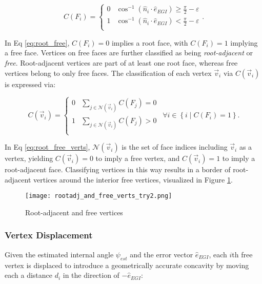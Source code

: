 \begin{equation} \label{eq:root_free}
  C(F_i) = \begin{cases} 
    0 & \cos^{-1}\left( \hat{n}_i \cdot \hat{e}_{EGI} \right) \geq \frac{\pi}{2} - \varepsilon \\
    1 & \cos^{-1}\left( \hat{n}_i \cdot \hat{e}_{EGI} \right) < \frac{\pi}{2} - \varepsilon \\
  \end{cases}.
\end{equation}

In Eq \ref{eq:root_free}, $C(F_i) = 0$ implies a root face, with $C(F_i) = 1$ implying a free face. Vertices on free faces are further classified as being \textit{root-adjacent} or \textit{free}. Root-adjacent vertices are part of at least one root face, whereas free vertices belong to only free faces. The classification of each vertex $\vec{v}_i$ via $C(\vec{v}_i)$ is expressed via:

\begin{equation} \label{eq:root_free_verts}
  C(\vec{v}_i) = \begin{cases}
    0 & \sum_{j \in \mathcal{N}(\vec{v}_i)}{C(F_j)} = 0 \\
    1 & \sum_{j \in \mathcal{N}(\vec{v}_i)}{C(F_j)} > 0 \\    
  \end{cases} \: \: \forall i \in \left\{ i \mid C(F_i) = 1 \right\}.
\end{equation}

In Eq \ref{eq:root_free_verts}, $\mathcal{N}(\vec{v}_i)$ is the set of face indices including $\vec{v}_i$ as a vertex, yielding $C(\vec{v}_i) = 0$ to imply a free vertex, and $C(\vec{v}_i) = 1$ to imply a root-adjacent face. Classifying vertices in this way results in a border of root-adjacent vertices around the interior free vertices, visualized in Figure \ref{fig:root_and_free}.

\begin{figure}[!htb]
  \centering
  \texttt{[image: rootadj\_and\_free\_verts\_try2.png]}
  \caption{Root-adjacent and free vertices}
  \label{fig:root_and_free}
\end{figure}

\subsubsection{Vertex Displacement}

Given the estimated internal angle $\psi_{est}$ and the error vector $\hat{e}_{EGI}$, each $i$th free vertex is displaced to introduce a geometrically accurate concavity by moving each a distance $d_i$ in the direction of $-\hat{e}_{EGI}$:


